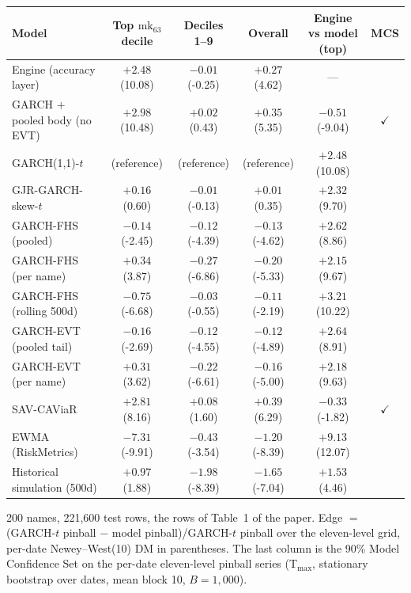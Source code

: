 \begin{tabular}{lccccc}
\toprule
Model & Top $\mathrm{mk}_{63}$ decile & Deciles 1--9 & Overall & Engine vs model (top) & MCS \\
\midrule
Engine (accuracy layer) & $+2.48$ (10.08) & $-0.01$ (-0.25) & $+0.27$ (4.62) & --- &  \\
GARCH $+$ pooled body (no EVT) & $+2.98$ (10.48) & $+0.02$ (0.43) & $+0.35$ (5.35) & $-0.51$ (-9.04) & $\checkmark$ \\
GARCH(1,1)-$t$ & (reference) & (reference) & (reference) & $+2.48$ (10.08) &  \\
GJR-GARCH-skew-$t$ & $+0.16$ (0.60) & $-0.01$ (-0.13) & $+0.01$ (0.35) & $+2.32$ (9.70) &  \\
GARCH-FHS (pooled) & $-0.14$ (-2.45) & $-0.12$ (-4.39) & $-0.13$ (-4.62) & $+2.62$ (8.86) &  \\
GARCH-FHS (per name) & $+0.34$ (3.87) & $-0.27$ (-6.86) & $-0.20$ (-5.33) & $+2.15$ (9.67) &  \\
GARCH-FHS (rolling 500d) & $-0.75$ (-6.68) & $-0.03$ (-0.55) & $-0.11$ (-2.19) & $+3.21$ (10.22) &  \\
GARCH-EVT (pooled tail) & $-0.16$ (-2.69) & $-0.12$ (-4.55) & $-0.12$ (-4.89) & $+2.64$ (8.91) &  \\
GARCH-EVT (per name) & $+0.31$ (3.62) & $-0.22$ (-6.61) & $-0.16$ (-5.00) & $+2.18$ (9.63) &  \\
SAV-CAViaR & $+2.81$ (8.16) & $+0.08$ (1.60) & $+0.39$ (6.29) & $-0.33$ (-1.82) & $\checkmark$ \\
EWMA (RiskMetrics) & $-7.31$ (-9.91) & $-0.43$ (-3.54) & $-1.20$ (-8.39) & $+9.13$ (12.07) &  \\
Historical simulation (500d) & $+0.97$ (1.88) & $-1.98$ (-8.39) & $-1.65$ (-7.04) & $+1.53$ (4.46) &  \\
\bottomrule
\end{tabular}
\begin{tablenotes}\footnotesize
\item 200 names, 221,600 test rows, the rows of Table~1 of the paper. Edge $=$ (GARCH-$t$ pinball $-$ model pinball)/GARCH-$t$ pinball over the eleven-level grid, per-date Newey--West(10) DM in parentheses. The last column is the 90\% Model Confidence Set on the per-date eleven-level pinball series (T$_{\max}$, stationary bootstrap over dates, mean block 10, $B=1{,}000$).
\end{tablenotes}
